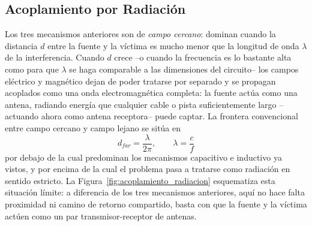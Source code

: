 \subsection{Acoplamiento por Radiación}\label{sub:acoplamiento_radiacion}

Los tres mecanismos anteriores son de \emph{campo cercano}: dominan cuando la distancia $d$ entre la fuente y la víctima es mucho menor que la longitud de onda $\lambda$ de la interferencia. Cuando $d$ crece --o cuando la frecuencia es lo bastante alta como para que $\lambda$ se haga comparable a las dimensiones del circuito-- los campos eléctrico y magnético dejan de poder tratarse por separado y se propagan acoplados como una onda electromagnética completa: la fuente actúa como una antena, radiando energía que cualquier cable o pista suficientemente largo --actuando ahora como antena receptora-- puede captar. La frontera convencional entre campo cercano y campo lejano se sitúa en
\begin{equation}\label{eq:frontera_campo_lejano}
    d_{far} = \frac{\lambda}{2\pi}, \qquad \lambda = \frac{c}{f}
\end{equation}
por debajo de la cual predominan los mecanismos capacitivo e inductivo ya vistos, y por encima de la cual el problema pasa a tratarse como radiación en sentido estricto. La Figura~\ref{fig:acoplamiento_radiacion} esquematiza esta situación límite: a diferencia de los tres mecanismos anteriores, aquí no hace falta proximidad ni camino de retorno compartido, basta con que la fuente y la víctima actúen como un par transmisor-receptor de antenas.

\begin{marginfigure}
    \centering
    \shorthandoff{>}
    \caption[Modelo del acoplamiento por radiación.]{Modelo del acoplamiento por radiación. Cuando la distancia $d$ a la fuente es comparable o mayor que la longitud de onda $\lambda$, la fuente actúa como una antena transmisora y cualquier conductor suficientemente largo de la víctima --actuando como antena receptora-- capta energía electromagnética, sin necesidad de conexión física ni de proximidad de campo cercano.}\label{fig:acoplamiento_radiacion}
\end{marginfigure}

